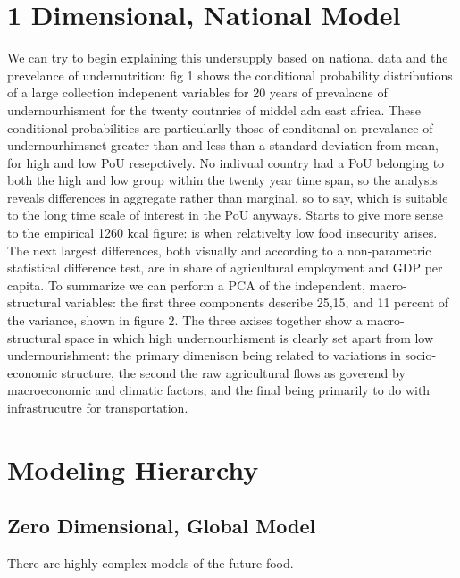 \documentclass[11pt]{article}
\begin{document}
 \section{1 Dimensional, National Model}
 
We can try to begin explaining this undersupply based on national data and the prevelance of undernutrition: fig 1 shows the conditional probability distributions of a large collection indepenent variables for 20 years of prevalacne of undernourhisment for the twenty coutnries of middel adn east africa. These conditional probabilities are particularlly those of conditonal on prevalance of undernourhimsnet greater than and less than a standard deviation from mean, for high and low PoU resepctively. No indivual country had a PoU belonging to both the high and low group within the twenty year time span, so the analysis reveals differences in aggregate rather than marginal, so to say, which is suitable to the long time scale of interest in the PoU anyways. 
Starts to give more sense to the empirical 1260 kcal figure: is when relativelty low food insecurity arises. The next largest differences, both visually and according to a non-parametric statistical difference test, are in share of agricultural employment and GDP per capita.  
To summarize we can perform a PCA of the independent, macro-structural variables: the first three components describe 25,15, and 11 percent of the variance, shown in figure 2. The three axises together show a macro-structural space in which high undernourhisment is clearly set apart from low undernourishment: the primary dimenison being related to variations in socio-economic structure, the second the raw agricultural flows as goverend by macroeconomic and climatic factors, and the final being primarily to do with infrastrucutre for transportation.


\section{Modeling Hierarchy}
\subsection{Zero Dimensional, Global Model}

 
There are highly complex models of the future food. 
 
\end{document}
